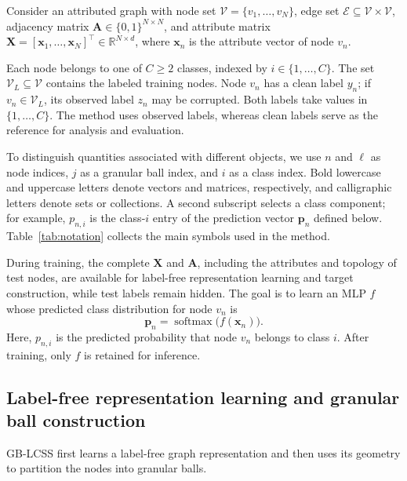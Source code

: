 \documentclass[a4paper,fleqn]{cas-sc}
\theoremstyle{definition}
\theoremstyle{plain}
\begin{document}
Consider an attributed graph with node set \(\mathcal V=\{v_1,\ldots,v_N\}\), edge set \(\mathcal E\subseteq\mathcal V\times\mathcal V\), adjacency matrix \(\mathbf A\in\{0,1\}^{N\times N}\), and attribute matrix \(\mathbf X=[\mathbf x_1,\ldots,\mathbf x_N]^\top\in\mathbb R^{N\times d}\), where \(\mathbf x_n\) is the attribute vector of node \(v_n\).

Each node belongs to one of \(C\geq2\) classes, indexed by \(i\in\{1,\ldots,C\}\). The set \(\mathcal V_L\subseteq\mathcal V\) contains the labeled training nodes. Node \(v_n\) has a clean label \(y_n\); if \(v_n\in\mathcal V_L\), its observed label \(z_n\) may be corrupted. Both labels take values in \(\{1,\ldots,C\}\). The method uses observed labels, whereas clean labels serve as the reference for analysis and evaluation.

To distinguish quantities associated with different objects, we use \(n\) and \(\ell\) as node indices, \(j\) as a granular ball index, and \(i\) as a class index. Bold lowercase and uppercase letters denote vectors and matrices, respectively, and calligraphic letters denote sets or collections. A second subscript selects a class component; for example, \(p_{n,i}\) is the class-\(i\) entry of the prediction vector \(\mathbf p_n\) defined below. Table~\ref{tab:notation} collects the main symbols used in the method.



During training, the complete \(\mathbf X\) and \(\mathbf A\), including the attributes and topology of test nodes, are available for label-free representation learning and target construction, while test labels remain hidden. The goal is to learn an MLP \(f\) whose predicted class distribution for node \(v_n\) is
\begin{equation}\label{eq:1}
\mathbf p_n=\operatorname{softmax}\bigl(f(\mathbf x_n)\bigr).
\end{equation}
Here, \(p_{n,i}\) is the predicted probability that node \(v_n\) belongs to class \(i\). After training, only \(f\) is retained for inference.

\subsection{Label-free representation learning and granular ball construction}\label{sec:3.2}

GB-LCSS first learns a label-free graph representation and then uses its geometry to partition the nodes into granular balls.
\end{document}
